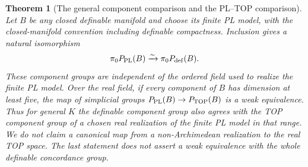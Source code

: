 \documentclass[11pt,a4paper]{article}
\newtheorem{theorem}{Theorem}[section]
\theoremstyle{definition}
\begin{document}
\begin{theorem}[The general component comparison and the PL--TOP comparison]\label{result-4}
Let $B$ be any closed definable manifold and choose its finite PL
model, with the closed-manifold convention including definable
compactness. Inclusion gives a natural isomorphism
\[
 \pi_0P_{\rm PL}(B)\xrightarrow{\sim}\pi_0P_{\rm def}(B).
\]
These component groups are independent of the ordered field used
to realize the finite PL model. Over the real field, if every
component of $B$ has dimension at least five, the map of
simplicial groups $P_{\rm PL}(B)\to P_{\rm TOP}(B)$ is a weak
equivalence. Thus for general $K$ the definable component group
also agrees with the TOP component group of a chosen real
realization of the finite PL model in that range. We do not claim
a canonical map from a non-Archimedean realization to the real
TOP space.
The last statement does not assert a weak equivalence with the
whole definable concordance group.
\end{theorem}
\end{document}
